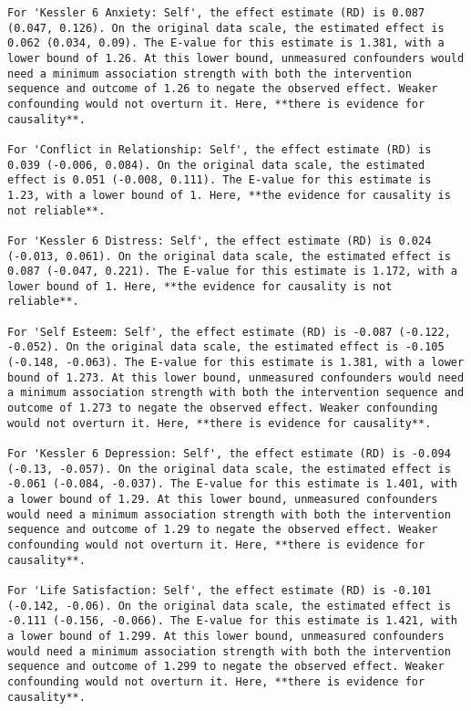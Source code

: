 \documentclass[
  singlecolumn]{article}
\begin{document}
\begin{verbatim}
For 'Kessler 6 Anxiety: Self', the effect estimate (RD) is 0.087 (0.047, 0.126). On the original data scale, the estimated effect is 0.062 (0.034, 0.09). The E-value for this estimate is 1.381, with a lower bound of 1.26. At this lower bound, unmeasured confounders would need a minimum association strength with both the intervention sequence and outcome of 1.26 to negate the observed effect. Weaker confounding would not overturn it. Here, **there is evidence for causality**.

For 'Conflict in Relationship: Self', the effect estimate (RD) is 0.039 (-0.006, 0.084). On the original data scale, the estimated effect is 0.051 (-0.008, 0.111). The E-value for this estimate is 1.23, with a lower bound of 1. Here, **the evidence for causality is not reliable**.

For 'Kessler 6 Distress: Self', the effect estimate (RD) is 0.024 (-0.013, 0.061). On the original data scale, the estimated effect is 0.087 (-0.047, 0.221). The E-value for this estimate is 1.172, with a lower bound of 1. Here, **the evidence for causality is not reliable**.

For 'Self Esteem: Self', the effect estimate (RD) is -0.087 (-0.122, -0.052). On the original data scale, the estimated effect is -0.105 (-0.148, -0.063). The E-value for this estimate is 1.381, with a lower bound of 1.273. At this lower bound, unmeasured confounders would need a minimum association strength with both the intervention sequence and outcome of 1.273 to negate the observed effect. Weaker confounding would not overturn it. Here, **there is evidence for causality**.

For 'Kessler 6 Depression: Self', the effect estimate (RD) is -0.094 (-0.13, -0.057). On the original data scale, the estimated effect is -0.061 (-0.084, -0.037). The E-value for this estimate is 1.401, with a lower bound of 1.29. At this lower bound, unmeasured confounders would need a minimum association strength with both the intervention sequence and outcome of 1.29 to negate the observed effect. Weaker confounding would not overturn it. Here, **there is evidence for causality**.

For 'Life Satisfaction: Self', the effect estimate (RD) is -0.101 (-0.142, -0.06). On the original data scale, the estimated effect is -0.111 (-0.156, -0.066). The E-value for this estimate is 1.421, with a lower bound of 1.299. At this lower bound, unmeasured confounders would need a minimum association strength with both the intervention sequence and outcome of 1.299 to negate the observed effect. Weaker confounding would not overturn it. Here, **there is evidence for causality**.


\end{verbatim}
\end{document}
